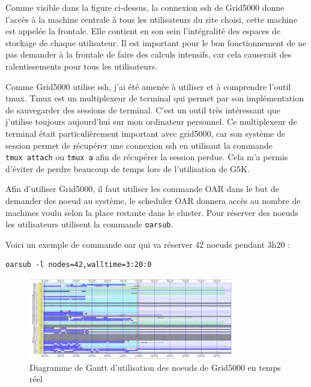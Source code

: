 \documentclass[a4paper,french,12pt, titlepage]{article}
\begin{document}
Comme visible dans la figure ci-dessus, la connexion ssh de Grid5000
donne l'accès à la machine centrale à tous les utilisateurs du site
choisi, cette machine est appelée la frontale. Elle contient en son sein
l'intégralité des espaces de stockage de chaque utilisateur. Il est
important pour le bon fonctionnement de ne pas demander à la frontale de
faire des calculs intensifs, car cela causerait des ralentissements pour
tous les utilisateurs. \newline

Comme Grid5000 utilise ssh, j'ai été amenée à utiliser et à comprendre
l'outil tmux. Tmux est un multiplexeur de terminal qui permet par son
implémentation de sauvegarder des sessions de terminal. C'est un outil
très intéressant que j'utilise toujours aujourd'hui sur mon ordinateur
personnel. Ce multiplexeur de terminal était particulièrement important
avec grid5000, car son système de session permet de récupérer une
connexion ssh en utilisant la commande \texttt{tmux\ attach} ou
\texttt{tmux\ a} afin de récupérer la session perdue. Cela m'a permis
d'éviter de perdre beaucoup de temps lors de l'utilisation de
G5K.\newline

Afin d'utiliser Grid5000, il faut utiliser les commande OAR dans le but
de demander des noeud au système, le scheduler OAR donnera accès au
nombre de machines voulu selon la place restante dans le cluster. Pour
réserver des noeuds les utilisateurs utilisent la commande
\texttt{oarsub}.

Voici un exemple de commande oar qui va réserver 42 noeuds pendant 3h20
:

\begin{verbatim}
oarsub -l nodes=42,walltime=3:20:0
\end{verbatim}

\begin{figure}[h]
\centering
\includegraphics[width=0.8\textwidth,height=0.8\textheight,keepaspectratio]{images/ganttg5k.png}
\caption{Diagramme de Gantt d'utilisation des noeuds de Grid5000 en temps réel}
\end{figure}
\end{document}
